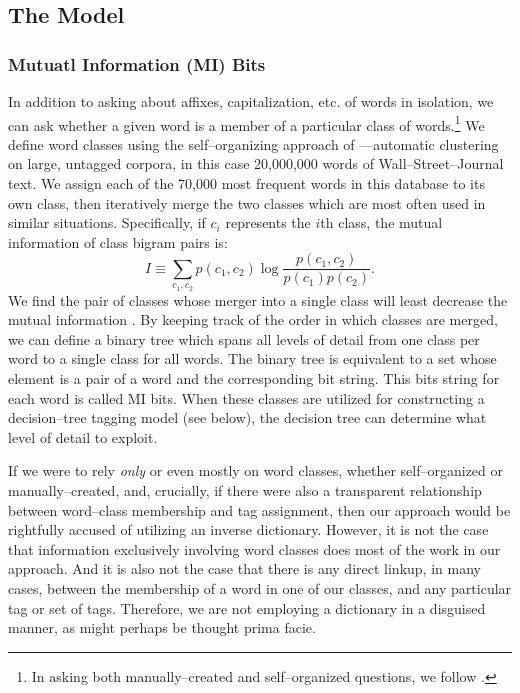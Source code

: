 \subsection{The Model}

\subsubsection{Mutuatl Information (MI) Bits}
\label{questions}

In addition to asking about affixes, capitalization, etc. of words in
isolation, we can ask whether a given word is a member of a particular
class of words.\footnote{In asking both manually--created and
self--organized questions, we follow \cite{Magerman:thesis}.} We
define word classes using the self--organizing approach of
\cite{Brown+al:class}---automatic clustering on large, untagged
corpora, in this case 20,000,000 words of Wall--Street--Journal text.
We assign each of the 70,000 most frequent words in this
database to its own class, then iteratively merge the two classes
which are most often used in similar situations.  Specifically, 
if $c_i$ represents the $i$th class, the mutual information
of class bigram pairs is:
\begin{equation}
I \equiv \sum_{c_1,c_2} p(c_1,c_2) \log \frac{p(c_1,c_2)}{p(c_1)p(c_2)}.
\end{equation}
We find the pair of classes whose merger into a single class will least
decrease the mutual information \cite{Ushioda96}.
By keeping track of the order in which
classes are merged, we can define a binary tree which spans all levels
of detail from one class per word to a single class for all words.
The binary tree is equivalent to a set whose element is a pair
of a word and the corresponding bit string.
This bits string for each word is called MI bits.
When these classes are utilized for constructing a decision--tree
tagging model (see below), the decision tree can determine what level
of detail to exploit.  

If we were to rely {\em only} or even mostly on word classes, whether
self--organized or manually--created, and, crucially, if there were
also a transparent relationship between word--class membership and tag
assignment, then our approach would be rightfully accused of utilizing
an inverse dictionary. However, it is not the case that information
exclusively involving word classes does most of the work in our
approach. And it is also not the case that there is any direct linkup,
in many cases, between the membership of a word in one of our classes,
and any particular tag or set of tags. Therefore, we are not employing
a dictionary in a disguised manner, as might perhaps be thought prima
facie.

